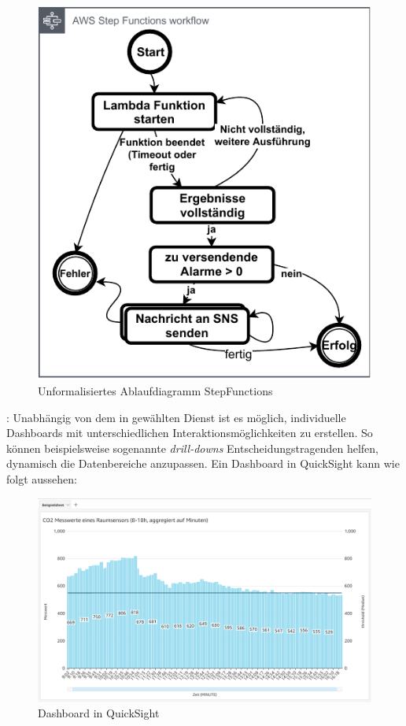 \begin{figure}[H]
\centering
\includegraphics[height=0.36\textheight]{graphics/Zustaende-DB-RA.pdf}
\caption{Unformalisiertes Ablaufdiagramm StepFunctions}
\label{abb:StepFunctionsRA}
\end{figure}

: Unabhängig von dem in  gewählten Dienst ist es möglich, individuelle Dashboards mit unterschiedlichen Interaktionsmöglichkeiten zu erstellen. So können beispielsweise sogenannte \textit{drill-downs} Entscheidungstragenden helfen, dynamisch die Datenbereiche anzupassen. Ein Dashboard in QuickSight kann wie folgt aussehen:
\begin{figure}[H]
\centering
\includegraphics[width=\textwidth]{graphics/QuickSight-Beispiel.png}
\caption{Dashboard in QuickSight}
\label{abb:DashboardDBRA}
\end{figure}

